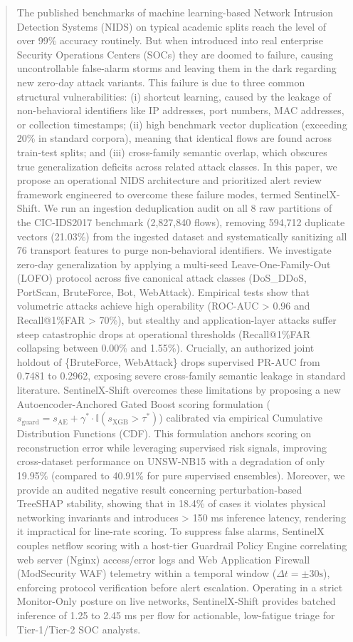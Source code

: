 \documentclass[conference,10pt,twocolumn]{IEEEtran}
\begin{document}
\begin{abstract}
The published benchmarks of machine learning-based Network Intrusion Detection Systems (NIDS) on typical academic splits reach the level of over 99\% accuracy routinely. But when introduced into real enterprise Security Operations Centers (SOCs) they are doomed to failure, causing uncontrollable false-alarm storms and leaving them in the dark regarding new zero-day attack variants. This failure is due to three common structural vulnerabilities: (i) shortcut learning, caused by the leakage of non-behavioral identifiers like IP addresses, port numbers, MAC addresses, or collection timestamps; (ii) high benchmark vector duplication (exceeding 20\% in standard corpora), meaning that identical flows are found across train-test splits; and (iii) cross-family semantic overlap, which obscures true generalization deficits across related attack classes. In this paper, we propose an operational NIDS architecture and prioritized alert review framework engineered to overcome these failure modes, termed SentinelX-Shift. We run an ingestion deduplication audit on all 8 raw partitions of the CIC-IDS2017 benchmark (2,827,840 flows), removing 594,712 duplicate vectors (21.03\%) from the ingested dataset and systematically sanitizing all 76 transport features to purge non-behavioral identifiers. We investigate zero-day generalization by applying a multi-seed Leave-One-Family-Out (LOFO) protocol across five canonical attack classes (DoS\_DDoS, PortScan, BruteForce, Bot, WebAttack). Empirical tests show that volumetric attacks achieve high operability (ROC-AUC > 0.96 and Recall@1\%FAR > 70\%), but stealthy and application-layer attacks suffer steep catastrophic drops at operational thresholds (Recall@1\%FAR collapsing between 0.00\% and 1.55\%). Crucially, an authorized joint holdout of \{BruteForce, WebAttack\} drops supervised PR-AUC from 0.7481 to 0.2962, exposing severe cross-family semantic leakage in standard literature. SentinelX-Shift overcomes these limitations by proposing a new Autoencoder-Anchored Gated Boost scoring formulation ($s_{\text{guard}} = s_{\text{AE}} + \gamma^* \cdot \mathbb{I}(s_{\text{XGB}} > \tau^*)$) calibrated via empirical Cumulative Distribution Functions (CDF). This formulation anchors scoring on reconstruction error while leveraging supervised risk signals, improving cross-dataset performance on UNSW-NB15 with a degradation of only 19.95\% (compared to 40.91\% for pure supervised ensembles). Moreover, we provide an audited negative result concerning perturbation-based TreeSHAP stability, showing that in 18.4\% of cases it violates physical networking invariants and introduces > 150 ms inference latency, rendering it impractical for line-rate scoring. To suppress false alarms, SentinelX couples netflow scoring with a host-tier Guardrail Policy Engine correlating web server (Nginx) access/error logs and Web Application Firewall (ModSecurity WAF) telemetry within a temporal window ($\Delta t = \pm 30\text{s}$), enforcing protocol verification before alert escalation. Operating in a strict Monitor-Only posture on live networks, SentinelX-Shift provides batched inference of 1.25 to 2.45 ms per flow for actionable, low-fatigue triage for Tier-1/Tier-2 SOC analysts.
\end{abstract}
\end{document}
